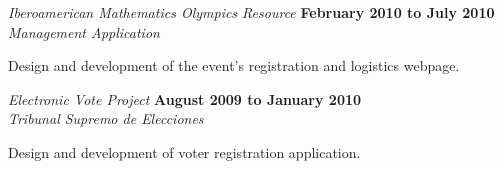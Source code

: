 \documentclass[10pt]{article}
\newenvironment{outerlist}[1][\enskip\textbullet]%
        {\begin{itemize}[#1]}{\end{itemize}%
         \vspace{-0.9\baselineskip}}
\newenvironment{innerlist}[1][\enskip\textbullet]%
        {\begin{compactitem}[#1]}{\end{compactitem}}
\begin{document}
\begin{outerlist}

	\item[] \textit{Iberoamerican Mathematics Olympics Resource}
		\hfill \textbf{February 2010 to July 2010} \\
		\textit{Management Application}
			\begin{innerlist}
			\item Design and development of the event's registration and logistics webpage.
			\end{innerlist}

	\item[] \textit{Electronic Vote Project}
		\hfill \textbf{August 2009 to January 2010}\\
		\textit{Tribunal Supremo de Elecciones}
			\begin{innerlist}
			\item Design and development of voter registration application.
			\end{innerlist}

\end{outerlist}
\end{document}
